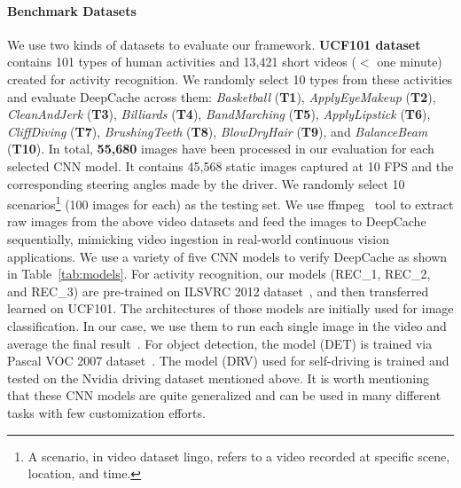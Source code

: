 \documentclass[10pt,acmtog]{acmart}
\newcommand{\framework}{DeepCache\xspace}
\newcommand{\revise}[1]{{#1}}
\begin{document}
\paragraph{Benchmark Datasets}
We use two kinds of datasets to evaluate our framework.
\textbf{UCF101 dataset}~\cite{UCF101} contains 101 types of human activities and 13,421 short videos ($<$ one minute) created for activity recognition.
We randomly select 10 types from these activities and evaluate \framework across them:
\emph{Basketball} (\textbf{T1}), \emph{ApplyEyeMakeup} (\textbf{T2}), \emph{CleanAndJerk} (\textbf{T3}), \emph{Billiards} (\textbf{T4}), \emph{BandMarching} (\textbf{T5}), \emph{ApplyLipstick} (\textbf{T6}), \emph{CliffDiving} (\textbf{T7}), \emph{BrushingTeeth} (\textbf{T8}), \emph{BlowDryHair} (\textbf{T9}), and \emph{BalanceBeam} (\textbf{T10}).
In total, \textbf{55,680} images have been processed in our evaluation for each selected CNN model.
It contains 45,568 static images captured at 10 FPS and the corresponding steering angles made by the driver.
We randomly select 10 scenarios\footnote{A scenario, in video dataset lingo, refers to a video recorded at specific scene, location, and time.} (100 images for each) as the testing set.
\revise{We use ffmpeg~\cite{ffmpeg} tool to extract raw images from the above video datasets and feed the images to \framework sequentially, mimicking video ingestion in real-world continuous vision applications.}%
We use a variety of five CNN models to verify \framework as shown in Table~\ref{tab:models}.
For activity recognition, our models (REC\_1, REC\_2, and REC\_3) are pre-trained on ILSVRC 2012 dataset~\cite{imagenet}, and then transferred learned on UCF101.
The architectures of those models are initially used for image classification.
In our case, we use them to run each single image in the video and average the final result~\cite{conf/cvpr/KarpathyTSLSF14}.
For object detection, the model (DET) is trained via Pascal VOC 2007 dataset~\cite{voc}.
The model (DRV) used for self-driving is trained and tested on the Nvidia driving dataset mentioned above.
It is worth mentioning that these CNN models are quite generalized and can be used in many different tasks with few customization efforts.
\end{document}
